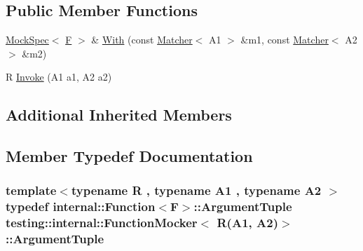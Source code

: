 \subsection*{Public Member Functions}
\begin{DoxyCompactItemize}
\item 
\hyperlink{classtesting_1_1internal_1_1_mock_spec}{Mock\+Spec}$<$ \hyperlink{classtesting_1_1internal_1_1_function_mocker_3_01_r_07_a1_00_01_a2_08_4_a61302610bfc9b30588ea345e468310b2}{F} $>$ \& \hyperlink{classtesting_1_1internal_1_1_function_mocker_3_01_r_07_a1_00_01_a2_08_4_a7e17361fadc89120c1254826baa3200e}{With} (const \hyperlink{classtesting_1_1_matcher}{Matcher}$<$ A1 $>$ \&m1, const \hyperlink{classtesting_1_1_matcher}{Matcher}$<$ A2 $>$ \&m2)
\item 
R \hyperlink{classtesting_1_1internal_1_1_function_mocker_3_01_r_07_a1_00_01_a2_08_4_a518f5ac78887c64580343554aaae8f44}{Invoke} (A1 a1, A2 a2)
\end{DoxyCompactItemize}
\subsection*{Additional Inherited Members}


\subsection{Member Typedef Documentation}
\subsubsection[{\texorpdfstring{Argument\+Tuple}{ArgumentTuple}}]{\setlength{\rightskip}{0pt plus 5cm}template$<$typename R , typename A1 , typename A2 $>$ typedef {\bf internal\+::\+Function}$<${\bf F}$>$\+::{\bf Argument\+Tuple} {\bf testing\+::internal\+::\+Function\+Mocker}$<$ R(A1, A2)$>$\+::{\bf Argument\+Tuple}}\hypertarget{classtesting_1_1internal_1_1_function_mocker_3_01_r_07_a1_00_01_a2_08_4_ae75e3ba40a99224f7363681914212c19}{}\label{classtesting_1_1internal_1_1_function_mocker_3_01_r_07_a1_00_01_a2_08_4_ae75e3ba40a99224f7363681914212c19}
